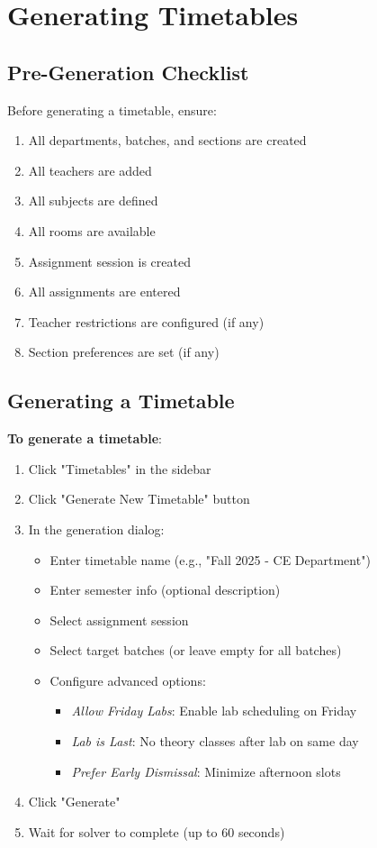 \documentclass[12pt,a4paper]{article}
\begin{document}
\section{Generating Timetables}

\subsection{Pre-Generation Checklist}

Before generating a timetable, ensure:
\begin{enumerate}
\item All departments, batches, and sections are created
\item All teachers are added
\item All subjects are defined
\item All rooms are available
\item Assignment session is created
\item All assignments are entered
\item Teacher restrictions are configured (if any)
\item Section preferences are set (if any)
\end{enumerate}

\subsection{Generating a Timetable}

\textbf{To generate a timetable}:
\begin{enumerate}
\item Click "Timetables" in the sidebar
\item Click "Generate New Timetable" button
\item In the generation dialog:
\begin{itemize}
\item Enter timetable name (e.g., "Fall 2025 - CE Department")
\item Enter semester info (optional description)
\item Select assignment session
\item Select target batches (or leave empty for all batches)
\item Configure advanced options:
\begin{itemize}
\item \textit{Allow Friday Labs}: Enable lab scheduling on Friday
\item \textit{Lab is Last}: No theory classes after lab on same day
\item \textit{Prefer Early Dismissal}: Minimize afternoon slots
\end{itemize}
\end{itemize}
\item Click "Generate"
\item Wait for solver to complete (up to 60 seconds)
\end{enumerate}
\end{document}
